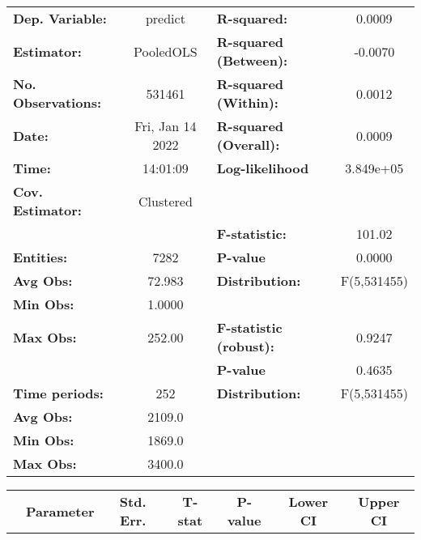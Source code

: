 \begin{center}
\begin{tabular}{lclc}
\toprule
\textbf{Dep. Variable:}    &      predict       & \textbf{  R-squared:         }   &      0.0009      \\
\textbf{Estimator:}        &     PooledOLS      & \textbf{  R-squared (Between):}  &     -0.0070      \\
\textbf{No. Observations:} &       531461       & \textbf{  R-squared (Within):}   &      0.0012      \\
\textbf{Date:}             &  Fri, Jan 14 2022  & \textbf{  R-squared (Overall):}  &      0.0009      \\
\textbf{Time:}             &      14:01:09      & \textbf{  Log-likelihood     }   &    3.849e+05     \\
\textbf{Cov. Estimator:}   &     Clustered      & \textbf{                     }   &                  \\
\textbf{}                  &                    & \textbf{  F-statistic:       }   &      101.02      \\
\textbf{Entities:}         &        7282        & \textbf{  P-value            }   &      0.0000      \\
\textbf{Avg Obs:}          &       72.983       & \textbf{  Distribution:      }   &   F(5,531455)    \\
\textbf{Min Obs:}          &       1.0000       & \textbf{                     }   &                  \\
\textbf{Max Obs:}          &       252.00       & \textbf{  F-statistic (robust):} &      0.9247      \\
\textbf{}                  &                    & \textbf{  P-value            }   &      0.4635      \\
\textbf{Time periods:}     &        252         & \textbf{  Distribution:      }   &   F(5,531455)    \\
\textbf{Avg Obs:}          &       2109.0       & \textbf{                     }   &                  \\
\textbf{Min Obs:}          &       1869.0       & \textbf{                     }   &                  \\
\textbf{Max Obs:}          &       3400.0       & \textbf{                     }   &                  \\
\bottomrule
\end{tabular}
\begin{tabular}{lcccccc}
                & \textbf{Parameter} & \textbf{Std. Err.} & \textbf{T-stat} & \textbf{P-value} & \textbf{Lower CI} & \textbf{Upper CI}  \\

\end{tabular}
\end{center}
